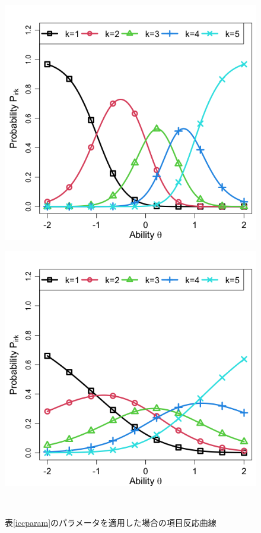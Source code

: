 \documentclass[a4paper,11pt,oneside,openany]{jsbook}
\begin{document}
\begin{center}
\begin{figure}[]
\begin{minipage}[b]{0.3\linewidth}
    \label{4}
  \end{minipage}
  \begin{minipage}[b]{0.3\linewidth}
    \centering
    \includegraphics[keepaspectratio,scale=0.22]{img/icc5.png}
    \label{5}
  \end{minipage}
  \begin{minipage}[b]{0.3\linewidth}
    \centering
    \includegraphics[keepaspectratio,scale=0.22]{img/icc6.png}
    \label{6}
  \end{minipage}\\
  \caption{表\ref{iccparam}のパラメータを適用した場合の項目反応曲線}\label{icc}
  \end{figure}
\end{center}
\end{document}
